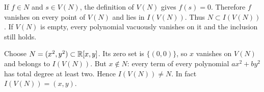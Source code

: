 If $f\in N$ and $s\in V(N)$, the definition of $V(N)$ gives $f(s)=0$. Therefore $f$ vanishes on every point of $V(N)$ and lies in $I(V(N))$. Thus $N\subset I(V(N))$. If $V(N)$ is empty, every polynomial vacuously vanishes on it and the inclusion still holds.

Choose $N=(x^2,y^2)\subset\mathbb{R}[x,y]$. Its zero set is $\{(0,0)\}$, so $x$ vanishes on $V(N)$ and belongs to $I(V(N))$. But $x\notin N$: every term of every polynomial $ax^2+by^2$ has total degree at least two. Hence $I(V(N))\ne N$. In fact $I(V(N))=(x,y)$.
